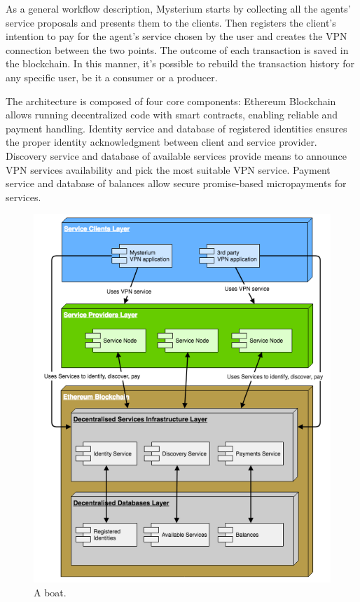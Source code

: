 \documentclass[]{article}
\begin{document}
	As a general workflow description, Mysterium starts by collecting all the agents' service proposals and presents them to the clients. Then registers the client's intention to pay for the agent's service chosen by the user and creates the VPN connection between the two points.
	The outcome of each transaction is saved in the blockchain. In this manner, it's possible to rebuild the transaction history for any specific user, be it a consumer or a producer.
	
	The architecture is composed of four core components:
	Ethereum Blockchain allows running decentralized code with smart contracts, enabling reliable and payment handling.
	Identity service and database of registered identities ensures the proper identity acknowledgment between client and service provider.
	Discovery service and database of available services provide means to announce VPN services availability and pick the most suitable VPN service.
	Payment service and database of balances allow secure promise-based micropayments for services.

	\begin{figure}
		\includegraphics[width=\linewidth]{"images/mysterium_architecture.png"}
		\caption{A boat.}
		\label{fig:boat1}
	\end{figure}
\end{document}
